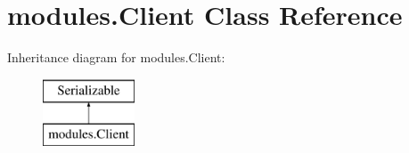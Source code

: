 \hypertarget{classmodules_1_1_client}{}\section{modules.\+Client Class Reference}
\label{classmodules_1_1_client}
Inheritance diagram for modules.\+Client\+:\begin{figure}[H]
\begin{center}
\leavevmode
\includegraphics[height=2.000000cm]{classmodules_1_1_client}
\end{center}
\end{figure}
